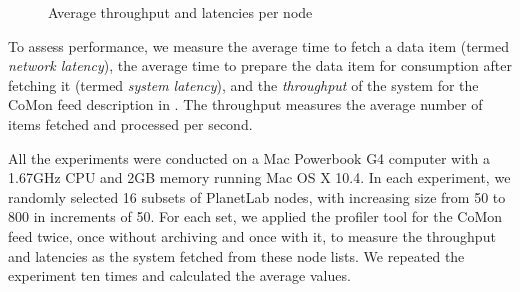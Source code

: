 \begin{figure}[t]
\begin{center}
\caption{Average throughput and latencies per node}
\label{fig:throughput}
\shrink
\end{center}
\end{figure}

To assess performance, we measure 
the average time to fetch a data item (termed {\em network latency}), 
the average time to prepare the data item for consumption
after fetching it (termed {\em system latency}),
and the {\em throughput} of the system for the CoMon feed
description in . 
The throughput measures the average
number of items fetched and processed per second. 

All the experiments were conducted on a Mac Powerbook G4 computer
with a 1.67GHz CPU and 2GB memory running Mac OS X 10.4.
In each experiment, we randomly selected 16 subsets of PlanetLab
nodes, with increasing size from 50 to 800 in increments of 50.
For each set, we applied the profiler tool for the CoMon feed
twice, once without archiving and once with it, to measure the
throughput and latencies as the system fetched from these node lists. 
We repeated the experiment ten times and calculated the average values.

